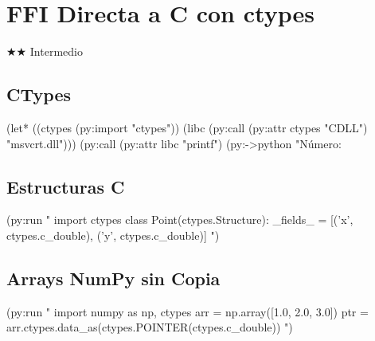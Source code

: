 \chapter{FFI Directa a C con ctypes}
\label{chap:ffi}
{\huge$\bigstar$}{\huge$\bigstar$} Intermedio

\section{CTypes}
\begin{lispcode}
(let* ((ctypes (py:import "ctypes"))
       (libc (py:call (py:attr ctypes "CDLL") "msvcrt.dll")))
  (py:call (py:attr libc "printf") (py:->python "Número: %
\end{lispcode}

\section{Estructuras C}
\begin{lispcode}
(py:run "
import ctypes
class Point(ctypes.Structure):
    _fields_ = [('x', ctypes.c_double), ('y', ctypes.c_double)]
")
\end{lispcode}

\section{Arrays NumPy sin Copia}
\begin{lispcode}
(py:run "
import numpy as np, ctypes
arr = np.array([1.0, 2.0, 3.0])
ptr = arr.ctypes.data_as(ctypes.POINTER(ctypes.c_double))
")
\end{lispcode}

